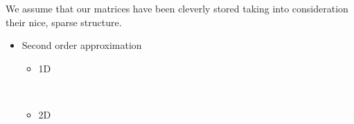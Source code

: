 \documentclass[12 pt, final]{article}
\begin{document}
\begin{itemize}
    We assume that our matrices have been cleverly stored taking into consideration their nice, sparse structure.
    \begin{itemize}
        \item Second order approximation
        \begin{itemize}
            \item 1D
            \begin{table}[H] %
            \\
            \end{table}   
            \item 2D


\end{itemize}
\end{itemize}
\end{itemize}
\end{document}
